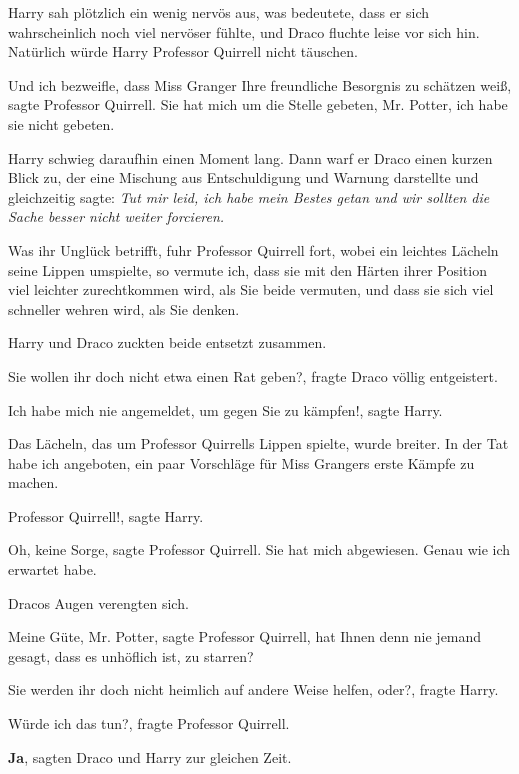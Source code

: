 Harry sah plötzlich ein wenig nervös aus, was bedeutete, dass er sich
wahrscheinlich noch viel nervöser fühlte, und Draco fluchte leise vor sich hin.
Natürlich würde Harry Professor Quirrell nicht täuschen.

\glqq{}Und ich bezweifle, dass Miss Granger Ihre freundliche Besorgnis zu
schätzen weiß\grqq{}, sagte Professor Quirrell. \glqq{}Sie hat mich um die
Stelle gebeten, Mr. Potter, ich habe sie nicht gebeten.\grqq{}

Harry schwieg daraufhin einen Moment lang. Dann warf er Draco einen kurzen Blick
zu, der eine Mischung aus Entschuldigung und Warnung darstellte und gleichzeitig
sagte: \emph{\glqq{}Tut mir leid, ich habe mein Bestes getan und wir sollten die
Sache besser nicht weiter forcieren.\grqq}

\glqq{}Was ihr Unglück betrifft\grqq{}, fuhr Professor Quirrell fort, wobei ein
leichtes Lächeln seine Lippen umspielte, \glqq{}so vermute ich, dass sie mit den
Härten ihrer Position viel leichter zurechtkommen wird, als Sie beide vermuten,
und dass sie sich viel schneller wehren wird, als Sie denken.\grqq{}

Harry und Draco zuckten beide entsetzt zusammen.

\glqq{}Sie wollen ihr doch nicht etwa einen Rat geben?\grqq{}, fragte Draco
völlig entgeistert.

\glqq{}Ich habe mich nie angemeldet, um gegen Sie zu kämpfen!\grqq{}, sagte
Harry.

Das Lächeln, das um Professor Quirrells Lippen spielte, wurde breiter. \glqq{}In
der Tat habe ich angeboten, ein paar Vorschläge für Miss Grangers erste Kämpfe
zu machen.\grqq{}

\glqq{}Professor Quirrell!\grqq{}, sagte Harry.

\glqq{}Oh, keine Sorge\grqq{}, sagte Professor Quirrell. \glqq{}Sie hat mich
abgewiesen. Genau wie ich erwartet habe.\grqq{}

Dracos Augen verengten sich.

\glqq{}Meine Güte, Mr. Potter\grqq{}, sagte Professor Quirrell, \glqq{}hat Ihnen
denn nie jemand gesagt, dass es unhöflich ist, zu starren?\grqq{}

\glqq{}Sie werden ihr doch nicht heimlich auf andere Weise helfen, oder?\grqq{},
fragte Harry.

\glqq{}Würde ich das tun?\grqq{}, fragte Professor Quirrell.

\glqq{}\textbf{Ja}\grqq{}, sagten Draco und Harry zur gleichen Zeit.

